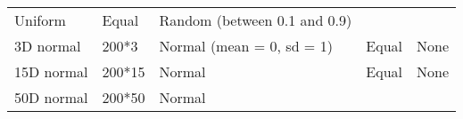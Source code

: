 \documentclass[]{article}
\begin{document}
\begin{longtable}[]{@{}lllll@{}}
\begin{minipage}[t]{0.31\columnwidth}
Uniform\strut
\end{minipage} & \begin{minipage}[t]{0.21\columnwidth}\raggedright\strut
Equal\strut
\end{minipage} & \begin{minipage}[t]{0.13\columnwidth}\raggedright\strut
Random (between 0.1 and 0.9)\strut
\end{minipage}\tabularnewline
\begin{minipage}[t]{0.12\columnwidth}\raggedright\strut
3D normal\strut
\end{minipage} & \begin{minipage}[t]{0.08\columnwidth}\raggedright\strut
200*3\strut
\end{minipage} & \begin{minipage}[t]{0.31\columnwidth}\raggedright\strut
Normal (mean = 0, sd = 1)\strut
\end{minipage} & \begin{minipage}[t]{0.21\columnwidth}\raggedright\strut
Equal\strut
\end{minipage} & \begin{minipage}[t]{0.13\columnwidth}\raggedright\strut
None\strut
\end{minipage}\tabularnewline
\begin{minipage}[t]{0.12\columnwidth}\raggedright\strut
15D normal\strut
\end{minipage} & \begin{minipage}[t]{0.08\columnwidth}\raggedright\strut
200*15\strut
\end{minipage} & \begin{minipage}[t]{0.31\columnwidth}\raggedright\strut
Normal\strut
\end{minipage} & \begin{minipage}[t]{0.21\columnwidth}\raggedright\strut
Equal\strut
\end{minipage} & \begin{minipage}[t]{0.13\columnwidth}\raggedright\strut
None\strut
\end{minipage}\tabularnewline
\begin{minipage}[t]{0.12\columnwidth}\raggedright\strut
50D normal\strut
\end{minipage} & \begin{minipage}[t]{0.08\columnwidth}\raggedright\strut
200*50\strut
\end{minipage} & \begin{minipage}[t]{0.31\columnwidth}\raggedright\strut
Normal\strut
\end{minipage} & \begin{minipage}[t]{0.21\columnwidth}\raggedright\strut

\end{minipage}
\end{longtable}
\end{document}
